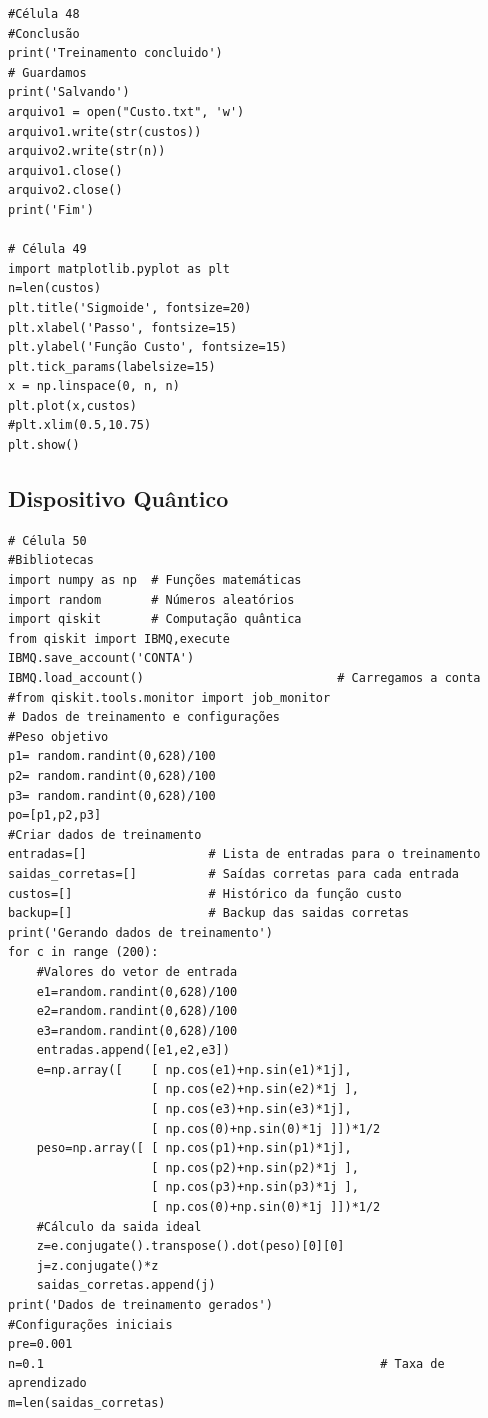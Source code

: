 \begin{verbatim}
#Célula 48
#Conclusão
print('Treinamento concluido')
# Guardamos
print('Salvando')
arquivo1 = open("Custo.txt", 'w')
arquivo1.write(str(custos))
arquivo2.write(str(n))
arquivo1.close()
arquivo2.close()
print('Fim')

# Célula 49
import matplotlib.pyplot as plt
n=len(custos)
plt.title('Sigmoide', fontsize=20)
plt.xlabel('Passo', fontsize=15)
plt.ylabel('Função Custo', fontsize=15)
plt.tick_params(labelsize=15)
x = np.linspace(0, n, n)
plt.plot(x,custos)
#plt.xlim(0.5,10.75)
plt.show()
\end{verbatim}
\subsection{Dispositivo Quântico}
\begin{verbatim}
# Célula 50
#Bibliotecas
import numpy as np  # Funções matemáticas
import random       # Números aleatórios
import qiskit       # Computação quântica
from qiskit import IBMQ,execute             
IBMQ.save_account('CONTA')
IBMQ.load_account()                           # Carregamos a conta
#from qiskit.tools.monitor import job_monitor  
# Dados de treinamento e configurações
#Peso objetivo
p1= random.randint(0,628)/100
p2= random.randint(0,628)/100
p3= random.randint(0,628)/100
po=[p1,p2,p3]
#Criar dados de treinamento
entradas=[]                 # Lista de entradas para o treinamento
saidas_corretas=[]          # Saídas corretas para cada entrada
custos=[]                   # Histórico da função custo
backup=[]                   # Backup das saidas corretas
print('Gerando dados de treinamento')
for c in range (200):
    #Valores do vetor de entrada
    e1=random.randint(0,628)/100
    e2=random.randint(0,628)/100
    e3=random.randint(0,628)/100
    entradas.append([e1,e2,e3])
    e=np.array([    [ np.cos(e1)+np.sin(e1)*1j],
                    [ np.cos(e2)+np.sin(e2)*1j ],
                    [ np.cos(e3)+np.sin(e3)*1j],
                    [ np.cos(0)+np.sin(0)*1j ]])*1/2
    peso=np.array([ [ np.cos(p1)+np.sin(p1)*1j],
                    [ np.cos(p2)+np.sin(p2)*1j ],
                    [ np.cos(p3)+np.sin(p3)*1j ],
                    [ np.cos(0)+np.sin(0)*1j ]])*1/2
    #Cálculo da saida ideal      
    z=e.conjugate().transpose().dot(peso)[0][0]
    j=z.conjugate()*z
    saidas_corretas.append(j)
print('Dados de treinamento gerados')
#Configurações iniciais
pre=0.001                                           
n=0.1                                               # Taxa de aprendizado
m=len(saidas_corretas)                              

\end{verbatim}
